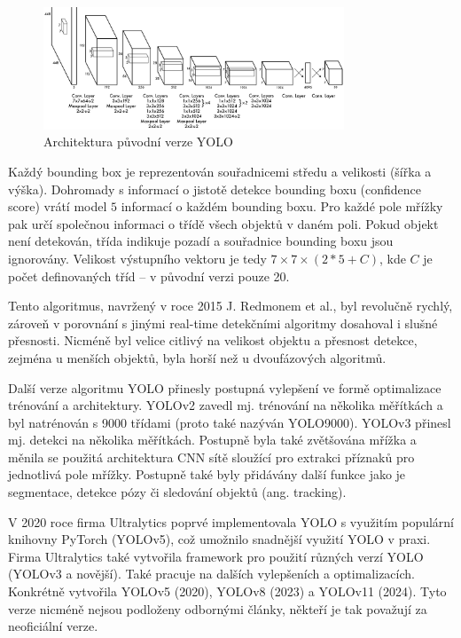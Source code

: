 \begin{figure}[]
    \centering
    \includegraphics[width=0.8\textwidth]{Figures/yolo}
    \caption{Architektura původní verze YOLO \cite{yolo}}
    \label{fig:yolo}
\end{figure}

Každý bounding box je reprezentován souřadnicemi středu a velikosti (šířka a
výška). Dohromady s informací o jistotě detekce bounding boxu (confidence
score) vrátí model $5$ informací o každém bounding boxu. Pro každé pole mřížky
pak určí společnou informaci o třídě všech objektů v daném poli. Pokud objekt
není detekován, třída indikuje pozadí a souřadnice bounding boxu jsou
ignorovány. Velikost výstupního vektoru je tedy $7 \times 7 \times (2 * 5 +
    C)$, kde $C$ je počet definovaných tříd – v původní verzi pouze 20.

Tento algoritmus, navržený v roce 2015 J. Redmonem et al., byl revolučně
rychlý, zároveň v porovnání s jinými real-time detekčními algoritmy dosahoval i
slušné přesnosti. Nicméně byl velice citlivý na velikost objektu a přesnost
detekce, zejména u menších objektů, byla horší než u dvoufázových algoritmů.

Další verze algoritmu YOLO přinesly postupná vylepšení ve formě optimalizace
trénování a architektury. YOLOv2 \cite{yolo9000} zavedl mj. trénování na
několika měřítkách a byl natrénován s 9000 třídami (proto také nazýván
YOLO9000). YOLOv3 \cite{yolov3} přinesl mj. detekci na několika měřítkách.
Postupně byla také zvětšována mřížka a měnila se použitá architektura CNN sítě
sloužící pro extrakci příznaků pro jednotlivá pole mřížky. Postupně také byly
přidávány další funkce jako je segmentace, detekce pózy či sledování objektů
(ang. tracking).

V 2020 roce firma Ultralytics poprvé implementovala YOLO s využitím populární
knihovny PyTorch (YOLOv5), což umožnilo snadnější využití YOLO v praxi. Firma
Ultralytics také vytvořila framework pro použití různých verzí YOLO (YOLOv3 a
novější). Také pracuje na dalších vylepšeních a optimalizacích. Konkrétně
vytvořila YOLOv5 (2020), YOLOv8 (2023) a YOLOv11 (2024). Tyto verze nicméně
nejsou podloženy odbornými články, někteří je tak považují za neoficiální
verze.

